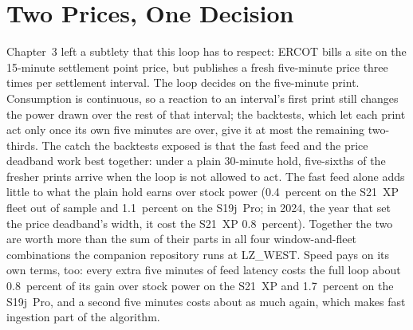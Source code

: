 \section{Two Prices, One Decision}

Chapter~3 left a subtlety that this loop has to respect: ERCOT bills a site on the 15-minute settlement point price, but publishes a fresh five-minute price three times per settlement interval. The loop decides on the five-minute print. Consumption is continuous, so a reaction to an interval's first print still changes the power drawn over the rest of that interval; the backtests, which let each print act only once its own five minutes are over, give it at most the remaining two-thirds. %
The catch the backtests exposed is that the fast feed and the price deadband work best together: under a plain 30-minute hold, five-sixths of the fresher prints arrive when the loop is not allowed to act. The fast feed alone adds little to what the plain hold earns over stock power (0.4~percent on the S21~XP fleet out of sample and 1.1~percent on the S19j~Pro; in 2024, the year that set the price deadband's width, it cost the S21~XP 0.8~percent). Together the two are worth more than the sum of their parts in all four window-and-fleet combinations the companion repository runs at LZ\_WEST. %
Speed pays on its own terms, too: every extra five minutes of feed latency costs the full loop about 0.8~percent of its gain over stock power on the S21~XP and 1.7~percent on the S19j~Pro, and a second five minutes costs about as much again, which makes fast ingestion part of the algorithm. %


